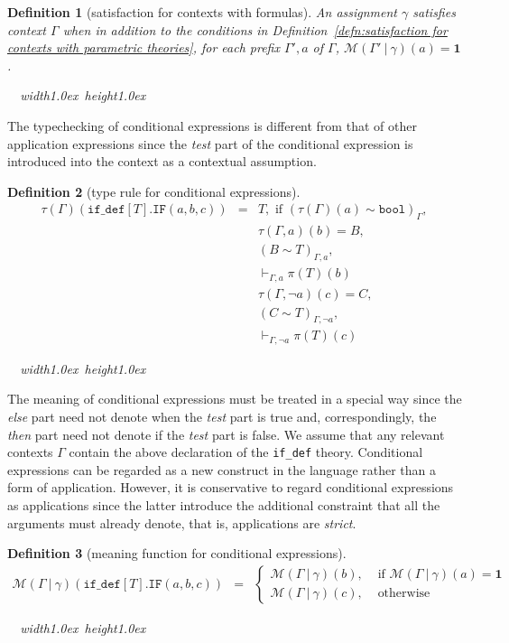 \documentclass [12pt,twoside]{cslreport}
\newcommand{\thmbox}
   {{\ \hfill\hbox{%
      \vrule width1.0ex height1.0ex
   }\parfillskip 0pt }}
\newcommand{\tauGamma}[1]{\tau(\Gamma)(#1)}
\newcommand{\Mgamma}[1]{{\mathcal M}(\Gamma\vbar\gamma)(#1)}
\newcommand{\oneb}{\mathbf{1}}
\newcommand{\ttif}{\mathtt{IF}}
\newcommand{\vbar}{\ |\ }
\newtheorem{definition}{Definition}
\newenvironment{Defn}[1]{\begin{definition}[#1]\label{defn:#1}}{
\thmbox\end{definition}}
\begin{document}
\begin{Defn}{satisfaction for contexts with formulas}
An assignment $\gamma$ satisfies context $\Gamma$ when in 
addition to the conditions in
Definition~\ref{defn:satisfaction for contexts with parametric theories},  
for each prefix $\Gamma', a$ of $\Gamma$, $\mathcal{M}(\Gamma'\vbar \gamma)(a)
= \oneb$\@.  
\end{Defn}

The typechecking of conditional expressions is different from that of
other application expressions since the \emph{test} part of the
conditional expression is introduced into the context as a contextual
assumption.
\begin{Defn}{type rule for conditional expressions}
   \begin{eqnarray*}
     \tauGamma{ \mathtt{ if\_def[\mathit{T}].IF}(a, b, c)} & = & T, \mbox{ if }
(\tauGamma{a} \sim  \mathtt{bool})_\Gamma,\\ & &
   \tau(\Gamma, a)(b) = B,\\& &  (B \sim T)_{\Gamma, a}, \\& & \vdash_{\Gamma,
a}\pi(T)(b)\\& & 
    \tau(\Gamma, \neg a)(c) = C,\\& &  (C \sim T)_{\Gamma, \neg a},\\ & & 
\vdash_{\Gamma, \neg a} \pi(T)(c)
\end{eqnarray*}
\end{Defn}

The meaning of conditional expressions must be treated in a special way
since the \emph{else} part need not denote when the \emph{test} part is
true and, correspondingly, the \emph{then} part need not denote if
the \emph{test} part is false.  We assume that any relevant contexts $\Gamma$
contain the above declaration of the \texttt{if\_def} theory.
Conditional expressions can be regarded as a
new construct in the language rather than a form of application.
However, it is conservative to regard conditional expressions as
applications since the latter introduce the additional constraint that all
the arguments must already denote, that is, applications are
\emph{strict}.
\begin{Defn}{meaning function for conditional expressions}
\begin{eqnarray*}
\Mgamma{\mathtt{if\_def}[T].\ttif(a, b, c)} & = &
 \left\{\begin{array}{ll}
	\Mgamma{b}, & \mbox{ if } \Mgamma{a} = \oneb\\
        \Mgamma{c}, & \mbox{ otherwise}
	\end{array}\right.
\end{eqnarray*}
\end{Defn}
\end{document}
